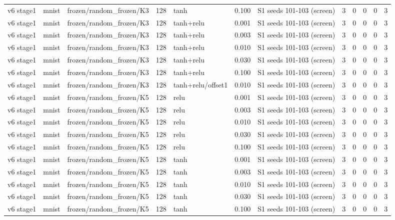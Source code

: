\begin{table}[htbp]
{\begin{tabular}{@{}lllrlrlrrrrr@{}}
v6 stage1 & mnist & frozen/random\_frozen/K3 & 128 & tanh & 0.100 & S1 seeds 101-103 (screen) & 3 & 0 & 0 & 0 & 3 \\
v6 stage1 & mnist & frozen/random\_frozen/K3 & 128 & tanh+relu & 0.001 & S1 seeds 101-103 (screen) & 3 & 0 & 0 & 0 & 3 \\
v6 stage1 & mnist & frozen/random\_frozen/K3 & 128 & tanh+relu & 0.003 & S1 seeds 101-103 (screen) & 3 & 0 & 0 & 0 & 3 \\
v6 stage1 & mnist & frozen/random\_frozen/K3 & 128 & tanh+relu & 0.010 & S1 seeds 101-103 (screen) & 3 & 0 & 0 & 0 & 3 \\
v6 stage1 & mnist & frozen/random\_frozen/K3 & 128 & tanh+relu & 0.030 & S1 seeds 101-103 (screen) & 3 & 0 & 0 & 0 & 3 \\
v6 stage1 & mnist & frozen/random\_frozen/K3 & 128 & tanh+relu & 0.100 & S1 seeds 101-103 (screen) & 3 & 0 & 0 & 0 & 3 \\
v6 stage1 & mnist & frozen/random\_frozen/K3 & 128 & tanh+relu/offset1 & 0.010 & S1 seeds 101-103 (screen) & 3 & 0 & 0 & 0 & 3 \\
v6 stage1 & mnist & frozen/random\_frozen/K5 & 128 & relu & 0.001 & S1 seeds 101-103 (screen) & 3 & 0 & 0 & 0 & 3 \\
v6 stage1 & mnist & frozen/random\_frozen/K5 & 128 & relu & 0.003 & S1 seeds 101-103 (screen) & 3 & 0 & 0 & 0 & 3 \\
v6 stage1 & mnist & frozen/random\_frozen/K5 & 128 & relu & 0.010 & S1 seeds 101-103 (screen) & 3 & 0 & 0 & 0 & 3 \\
v6 stage1 & mnist & frozen/random\_frozen/K5 & 128 & relu & 0.030 & S1 seeds 101-103 (screen) & 3 & 0 & 0 & 0 & 3 \\
v6 stage1 & mnist & frozen/random\_frozen/K5 & 128 & relu & 0.100 & S1 seeds 101-103 (screen) & 3 & 0 & 0 & 0 & 3 \\
v6 stage1 & mnist & frozen/random\_frozen/K5 & 128 & tanh & 0.001 & S1 seeds 101-103 (screen) & 3 & 0 & 0 & 0 & 3 \\
v6 stage1 & mnist & frozen/random\_frozen/K5 & 128 & tanh & 0.003 & S1 seeds 101-103 (screen) & 3 & 0 & 0 & 0 & 3 \\
v6 stage1 & mnist & frozen/random\_frozen/K5 & 128 & tanh & 0.010 & S1 seeds 101-103 (screen) & 3 & 0 & 0 & 0 & 3 \\
v6 stage1 & mnist & frozen/random\_frozen/K5 & 128 & tanh & 0.030 & S1 seeds 101-103 (screen) & 3 & 0 & 0 & 0 & 3 \\
v6 stage1 & mnist & frozen/random\_frozen/K5 & 128 & tanh & 0.100 & S1 seeds 101-103 (screen) & 3 & 0 & 0 & 0 & 3 \\

\end{tabular}}
\end{table}
